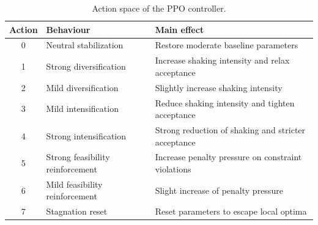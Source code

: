 \begin{table}[ht]
\centering
\caption{Action space of the PPO controller.}
\label{tab:ppo_actions}
\begin{tabular}{cll}
\hline
Action & Behaviour & Main effect \\
\hline
0 & Neutral stabilization &
Restore moderate baseline parameters \\

1 & Strong diversification &
Increase shaking intensity and relax acceptance \\

2 & Mild diversification &
Slightly increase shaking intensity \\

3 & Mild intensification &
Reduce shaking intensity and tighten acceptance \\

4 & Strong intensification &
Strong reduction of shaking and stricter acceptance \\

5 & Strong feasibility reinforcement &
Increase penalty pressure on constraint violations \\

6 & Mild feasibility reinforcement &
Slight increase of penalty pressure \\

7 & Stagnation reset &
Reset parameters to escape local optima \\

\hline
\end{tabular}
\end{table}